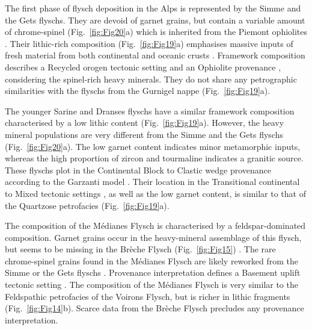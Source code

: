 \documentclass[twoside]{article}
\begin{document}
The first phase of flysch deposition in the Alps is represented by the Simme and the Gets flyschs. They are devoid of garnet grains, but contain a variable amount of chrome-spinel (Fig.~\ref{fig:Fig20}a) which is inherited from the Piemont ophiolites \citep{Bertrand1976,Bill1997,Beltran-Trivino2013}. Their lithic-rich composition (Fig.~\ref{fig:Fig19}a) emphasises massive inputs of fresh material from both continental and oceanic crusts \citep[and references therein]{Gasinski1997}. Framework composition describes a Recycled orogen tectonic setting \citep{Dickinson1979a} and an Ophiolite provenance \citep{Garzanti2007b}, considering the spinel-rich heavy minerals. They do not share any petrographic similarities with the flyschs from the Gurnigel nappe (Fig.~\ref{fig:Fig19}a).\par
\medskip
The younger Sarine and Dranses flyschs have a similar framework composition characterised by a low lithic content (Fig.~\ref{fig:Fig19}a). However, the heavy mineral populations are very different from the Simme and the Gets flyschs (Fig.~\ref{fig:Fig20}a). The low garnet content indicates minor metamorphic inputs, whereas the high proportion of zircon and tourmaline indicates a granitic source. These flyschs plot in the Continental Block to Clastic wedge provenance according to the Garzanti model \citep{Garzanti2007b}. Their location in the Transitional continental to Mixed tectonic settings \citep{Dickinson1979a,Dickinson1985}, as well as the low garnet content, is similar to that of the Quartzose petrofacies (Fig.~\ref{fig:Fig19}a).\par
\medskip
The composition of the Médianes Flysch is characterised by a feldspar-dominated composition. Garnet grains occur in the heavy-mineral assemblage of this flysch, but seems to be missing in the Brèche Flysch (Fig.~\ref{fig:Fig15}) . The rare chrome-spinel grains found in the Médianes Flysch \citep{Fluck1973} are likely reworked from the Simme or the Gets flyschs \citep{Beltran-Trivino2013}. Provenance interpretation defines a Basement uplift tectonic setting \citep{Dickinson1979a,Dickinson1985}. The composition of the Médianes Flysch is very similar to the Feldspathic petrofacies of the Voirons Flysch, but is richer in lithic fragments (Fig.~\ref{fig:Fig14}b). Scarce data from the Brèche Flysch precludes any provenance interpretation.\par
\medskip
\end{document}
